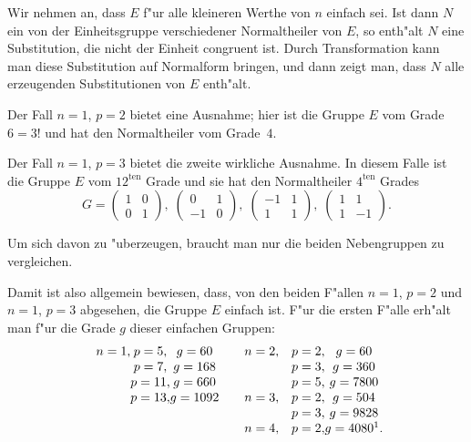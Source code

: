 \documentclass[12pt,a4paper]{article}
\theoremstyle{plain}
\theoremstyle{definition}
\theoremstyle{remark}
\begin{document}
Wir nehmen an, dass $E$ f"ur alle kleineren Werthe von $n$ einfach sei. Ist dann $N$ ein von der Einheitsgruppe verschiedener Normaltheiler von $E$, so enth"alt $N$ eine Substitution, die nicht der Einheit congruent ist. Durch Transformation kann man diese Substitution auf Normalform bringen, und dann zeigt man, dass $N$ alle erzeugenden Substitutionen von $E$ enth"alt.

Der Fall $n = 1$, $p = 2$ bietet eine Ausnahme; hier ist die Gruppe $E$ vom Grade $6 = 3!$ und hat den Normaltheiler vom Grade~$4$.

Der Fall $n = 1$, $p = 3$ bietet die zweite wirkliche Ausnahme. In diesem Falle ist die Gruppe $E$ vom $12^{\text{ten}}$ Grade und sie hat den Normaltheiler $4^{\text{ten}}$ Grades
\[
G = \begin{pmatrix} 1 & 0 \\ 0 & 1 \end{pmatrix},\;
\begin{pmatrix} 0 & 1 \\ -1 & 0 \end{pmatrix},\;
\begin{pmatrix} -1 & 1 \\ 1 & 1 \end{pmatrix},\;
\begin{pmatrix} 1 & 1 \\ 1 & -1 \end{pmatrix}.
\]

Um sich davon zu "uberzeugen, braucht man nur die beiden Nebengruppen zu vergleichen.

Damit ist also allgemein bewiesen, dass, von den beiden F"allen $n = 1$, $p = 2$ und $n = 1$, $p = 3$ abgesehen, die Gruppe $E$ einfach ist. F"ur die ersten F"alle erh"alt man f"ur die Grade $g$ dieser einfachen Gruppen:
\[
\begin{array}{r@{}c@{}c@{}ccr@{}c@{}c@{}c}
n = 1, & p = 5, & g = 60 & \quad & n = 2, & p = 2, & g = 60 \\
      & p = 7, & g = 168 & \quad &       & p = 3, & g = 360 \\
      & p = 11, & g = 660 & \quad &      & p = 5, & g = 7800 \\
      & p = 13, & g = 1092 & \quad & n = 3, & p = 2, & g = 504 \\
      &         &          & \quad &       & p = 3, & g = 9828 \\
      &         &          & \quad & n = 4, & p = 2, & g = 4080\footnotemark.
\end{array}
\]
\end{document}
